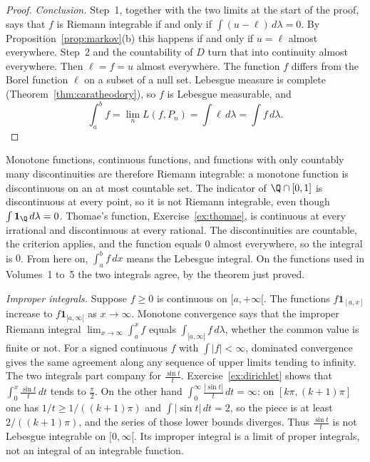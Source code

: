 \begin{proof}
\emph{Conclusion.} Step~1, together with the two limits at the start of the proof, says that \(f\) is Riemann integrable if and only if \(\int(u-\ell)\,d\lambda=0\). By Proposition~\ref{prop:markov}(b) this happens if and only if \(u=\ell\) almost everywhere. Step~2 and the countability of \(D\) turn that into continuity almost everywhere. Then \(\ell=f=u\) almost everywhere. The function \(f\) differs from the Borel function \(\ell\) on a subset of a null set. Lebesgue measure is complete (Theorem~\ref{thm:caratheodory}), so \(f\) is Lebesgue measurable, and
\[
\int_a^bf=\lim_nL(f,P_n)=\int\ell\,d\lambda=\int f\,d\lambda.
\]
\end{proof}

Monotone functions, continuous functions, and functions with only countably many discontinuities are therefore Riemann integrable: a monotone function is discontinuous on an at most countable set. The indicator of \(\Q\cap[0,1]\) is discontinuous at every point, so it is not Riemann integrable, even though \(\int\mathbf 1_\Q\,d\lambda=0\). Thomae's function, Exercise~\ref{ex:thomae}, is continuous at every irrational and discontinuous at every rational. The discontinuities are countable, the criterion applies, and the function equals \(0\) almost everywhere, so the integral is \(0\). From here on, \(\int_a^bf\,dx\) means the Lebesgue integral. On the functions used in Volumes~1 to~5 the two integrals agree, by the theorem just proved.

\emph{Improper integrals.} Suppose \(f\ge0\) is continuous on \([a,+\infty[\). The functions \(f\mathbf 1_{[a,x]}\) increase to \(f\mathbf 1_{[a,\infty[}\) as \(x\to\infty\). Monotone convergence says that the improper Riemann integral \(\lim_{x\to\infty}\int_a^xf\) equals \(\int_{[a,\infty[}f\,d\lambda\), whether the common value is finite or not. For a signed continuous \(f\) with \(\int|f|<\infty\), dominated convergence gives the same agreement along any sequence of upper limits tending to infinity. The two integrals part company for \(\frac{\sin t}t\). Exercise~\ref{ex:dirichlet} shows that \(\int_0^x\frac{\sin t}t\,dt\) tends to \(\frac\pi2\). On the other hand \(\int_0^\infty\frac{|\sin t|}t\,dt=\infty\): on \([k\pi,(k+1)\pi]\) one has \(1/t\ge1/((k+1)\pi)\) and \(\int|\sin t|\,dt=2\), so the piece is at least \(2/((k+1)\pi)\), and the series of those lower bounds diverges. Thus \(\frac{\sin t}t\) is not Lebesgue integrable on \([0,\infty[\). Its improper integral is a limit of proper integrals, not an integral of an integrable function.

